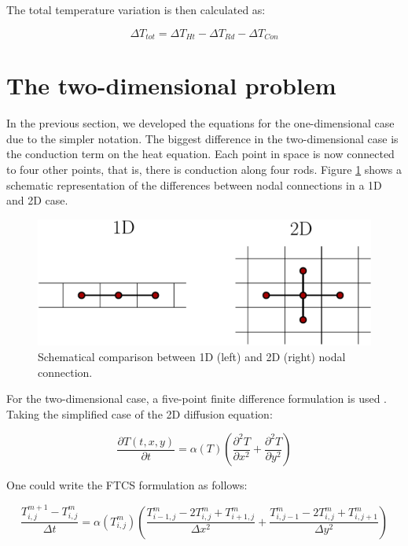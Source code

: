 The total temperature variation is then calculated as: 

\begin{equation}
    \Delta T_{tot} = \Delta T_{Ht} - \Delta T_{Rd} - \Delta T_{Con}
\end{equation}


\section{The two-dimensional problem}

In the previous section, we developed the equations for the one-dimensional case due to the simpler notation. The biggest difference in the two-dimensional case is the conduction term on the heat equation. Each point in space is now connected to four other points, that is, there is conduction along four rods. Figure \ref{fig:1Dvs2D} shows a schematic representation of the differences between nodal connections in a 1D and 2D case.  

\begin{figure}[h]
    \centering
    \includegraphics[width=0.60\columnwidth]{1D_vs_2D_cond/1Dvs2F.pdf}
    \caption{Schematical comparison between 1D (left) and 2D (right) nodal connection.}
    \label{fig:1Dvs2D}
\end{figure}

For the two-dimensional case, a five-point finite difference formulation is used \parencite[][]{ref:FiniteDifference}. Taking the simplified case of the 2D diffusion equation: 

\begin{equation}
    \frac{\partial T(t,x,y)}{\partial t} = \alpha (T) \left(\frac{\partial^2 T}{\partial x^2}+\frac{\partial ^2 T}{\partial y^2}\right)
\end{equation}

One could write the FTCS formulation as follows: 

\begin{equation}
    \frac{T_{i,j}^{m+1} - T_{i,j}^{m}}{\Delta t} = \alpha(T_{i,j}^{m}) \left( \frac{T_{i-1,j}^{m} -2T_{i,j}^{m}+T_{i+1,j}^{m}}{\Delta x^2} +  \frac{T_{i,j-1}^{m}-2T_{i,j}^{m}+T_{i,j+1}^{m}}{\Delta y^2} \right)
\end{equation}

